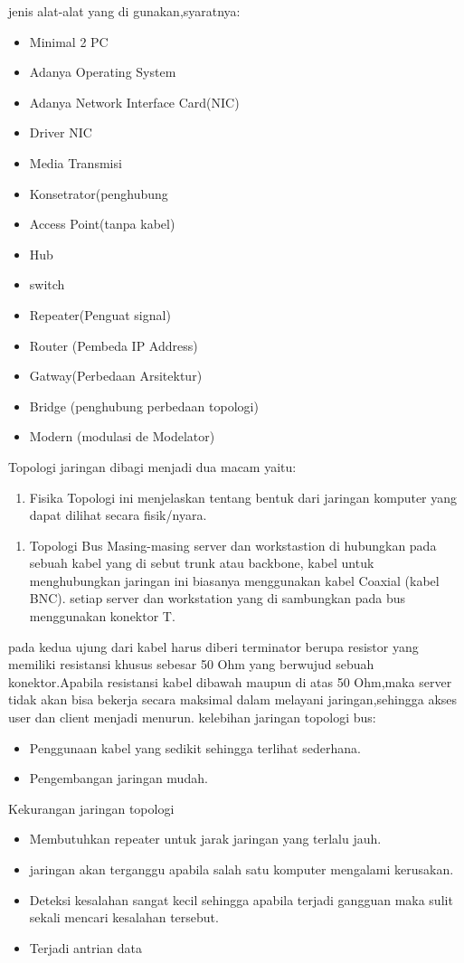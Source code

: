 jenis alat-alat yang di gunakan,syaratnya:
\begin{itemize}
  \item Minimal 2 PC
  \item Adanya Operating System
  \item Adanya Network Interface Card(NIC)
  \item Driver NIC
  \item Media Transmisi
  \item Konsetrator(penghubung
  \item Access Point(tanpa kabel)
  \item Hub
  \item switch
  \item Repeater(Penguat signal)
  \item Router (Pembeda IP Address)
  \item Gatway(Perbedaan Arsitektur)
  \item Bridge (penghubung perbedaan topologi)
  \item Modern (modulasi de Modelator)
\end{itemize}

Topologi jaringan dibagi menjadi dua macam yaitu:
\begin{enumerate}
  \item Fisika
        Topologi ini menjelaskan tentang bentuk dari jaringan komputer yang dapat dilihat secara fisik/nyara.
\end{enumerate}

\begin{enumerate}
  \item Topologi Bus
        Masing-masing server dan workstastion di hubungkan pada sebuah kabel yang di sebut trunk atau backbone, kabel untuk menghubungkan jaringan ini biasanya menggunakan kabel Coaxial (kabel BNC). setiap server dan workstation yang di sambungkan pada bus menggunakan konektor T.
\end{enumerate}
 pada kedua ujung dari kabel harus diberi terminator berupa resistor yang memiliki resistansi khusus sebesar 50 Ohm yang berwujud sebuah konektor.Apabila resistansi kabel dibawah maupun di atas 50 Ohm,maka server tidak akan bisa bekerja secara maksimal dalam melayani jaringan,sehingga akses user dan client menjadi menurun.
 kelebihan jaringan topologi bus:
 \begin{itemize}
   \item Penggunaan kabel yang sedikit sehingga terlihat sederhana.
   \item Pengembangan jaringan mudah.
 \end{itemize}
 Kekurangan jaringan topologi
 \begin{itemize}
   \item Membutuhkan repeater untuk jarak jaringan yang terlalu jauh.
   \item jaringan akan terganggu apabila salah satu komputer mengalami kerusakan.
   \item Deteksi kesalahan sangat kecil sehingga apabila terjadi gangguan maka sulit sekali mencari kesalahan tersebut.
   \item Terjadi antrian data
 \end{itemize}

